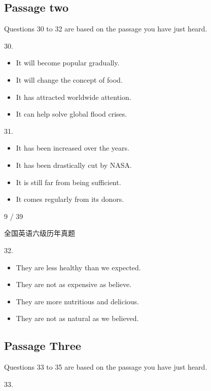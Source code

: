 \documentclass[UTF8,11pt]{ctexart}
\begin{document}
\subsection*{\textbf{Passage two}}


Questions 30 to 32 are based on the passage you have just heard.


30.


\begin{itemize}[leftmargin=2em,itemsep=.2em,topsep=.4em]\item[A.] It will become popular gradually.
\item[B.] It will change the concept of food.
\item[C.] It has attracted worldwide attention.
\item[D.] It can help solve global flood crises.
\end{itemize}

31.


\begin{itemize}[leftmargin=2em,itemsep=.2em,topsep=.4em]\item[A.] It has been increased over the years.
\item[B.] It has been drastically cut by NASA.
\item[C.] It is still far from being sufficient.
\item[D.] It comes regularly from its donors.
\end{itemize}

9 / 39


全国英语六级历年真题


32.


\begin{itemize}[leftmargin=2em,itemsep=.2em,topsep=.4em]\item[A.] They are less healthy than we expected.
\item[B.] They are not as expensive as believe.
\item[C.] They are more nutritious and delicious.
\item[D.] They are not as natural as we believed.
\end{itemize}

\subsection*{\textbf{Passage Three}}


Questions 33 to 35 are based on the passage you have just heard.


33.
\end{document}
